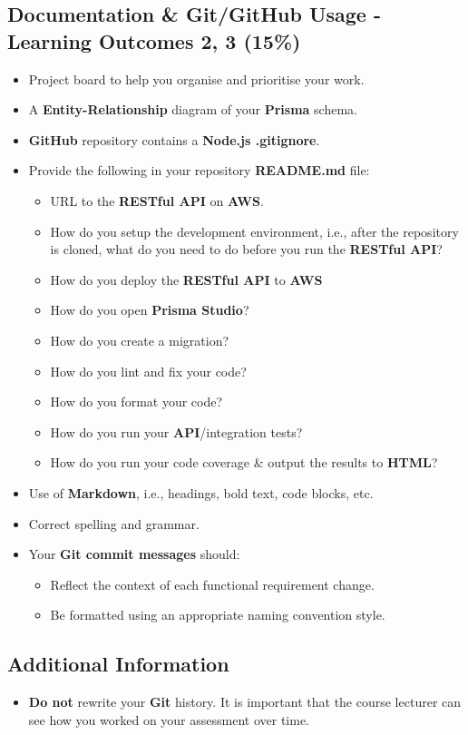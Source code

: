 \documentclass{article}
\begin{document}
\subsection*{Documentation \& Git/GitHub Usage - Learning Outcomes 2, 3 (15\%)}
\begin{itemize}
	\item Project board to help you organise and prioritise your work. 
	\item A \textbf{Entity-Relationship} diagram of your \textbf{Prisma} schema.
	\item \textbf{GitHub} repository contains a \textbf{Node.js .gitignore}.
	\item Provide the following in your repository \textbf{README.md} file:
	\begin{itemize}
		\item URL to the \textbf{RESTful API} on \textbf{AWS}.
		\item How do you setup the development environment, i.e., after the repository is cloned, what do you need to do before you run the \textbf{RESTful API}?
		\item How do you deploy the \textbf{RESTful API} to \textbf{AWS}
		\item How do you open \textbf{Prisma Studio}?
		\item How do you create a migration?
		\item How do you lint and fix your code?
		\item How do you format your code?
		\item How do you run your \textbf{API}/integration tests?
		\item How do you run your code coverage \& output the results to \textbf{HTML}?
	\end{itemize}
	\item Use of \textbf{Markdown}, i.e., headings, bold text, code blocks, etc.
	\item Correct spelling and grammar. 
	\item Your \textbf{Git commit messages} should:
	\begin{itemize}
		\item Reflect the context of each functional requirement change.
		\item Be formatted using an appropriate naming convention style.
	\end{itemize}	
\end{itemize}

\subsection*{Additional Information}
\begin{itemize}
	\item \textbf{Do not} rewrite your \textbf{Git} history. It is important that the course lecturer can see how you worked on your assessment over time.
\end{itemize}
\end{document}
